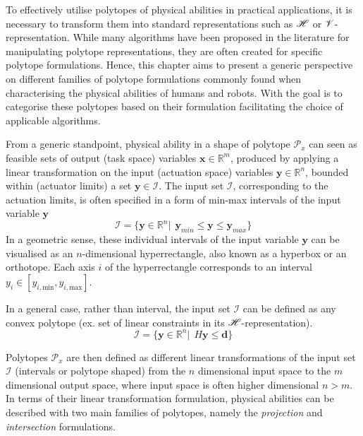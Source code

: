 
To effectively utilise polytopes of physical abilities in practical applications, it is necessary to transform them into standard representations such as $\mathscr{H}$ or $\mathscr{V}$-representation. While many algorithms have been proposed in the literature for manipulating polytope representations, they are often created for specific polytope formulations. Hence, this chapter aims to present a generic perspective on different families of polytope formulations commonly found when characterising the physical abilities of humans and robots. With the goal is to categorise these polytopes based on their formulation facilitating the choice of applicable algorithms.

From a generic standpoint, physical ability in a shape of polytope $\mathcal{P}_x$ can seen as feasible sets of output (task space) variables $\bm{x} \in \mathbb{R}^m$, produced by applying a linear transformation on the input (actuation space) variables $\bm{y} \in \mathbb{R}^n$, bounded within (actuator limits) a set $\bm{y}\in\mathcal{I}$. The input set $\mathcal{I}$, corresponding to the actuation limits, is often specified in a form of min-max intervals of the input variable $\bm{y}$
\begin{equation}
    \mathcal{I} = \{\bm{y}\in \mathbb{R}^n |~~ \bm{y}_{min} \leq \bm{y}\leq \bm{y}_{max} \}
    \label{eq:hypercube_lim}
\end{equation}
In a geometric sense, these individual intervals of the input variable $\bm{y}$ can be visualised as an $n$-dimensional hyperrectangle, also known as a hyperbox or an orthotope. Each axis $i$ of the hyperrectangle corresponds to an interval $y_i\in[y_{i,\text{min}},y_{i,\text{max}}]$.

In a general case, rather than interval, the input set $\mathcal{I}$ can be defined as any convex polytope (ex. set of linear constraints in its $\mathscr{H}$-representation).
\begin{equation}
    \mathcal{I} = \{\bm{y}\in \mathbb{R}^n|~~ H\bm{y}\leq \bm{d} \}
\end{equation}

Polytopes $\mathcal{P}_x$ are then defined as different linear transformations of the input set $\mathcal{I}$ (intervals or polytope shaped) from the $n$ dimensional input space to the $m$ dimensional output space, where input space is often higher dimensional $n>m$. In terms of their linear transformation formulation, physical abilities can be described with two main families of polytopes, namely the \textit{projection} and \textit{intersection} formulations.

